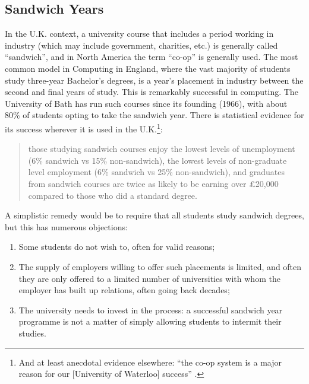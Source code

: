\documentclass[sigconf,anonymous]{acmart}
\begin{document}
\subsection{Sandwich Years}

In the U.K. context, a university course that includes a period
working in industry (which may include government, charities, etc.) is
generally called ``sandwich'', and in North America the term ``co-op''
is generally used. The most common model in Computing in England,
where the vast majority of students study three-year Bachelor's
degrees, is a year's placement in industry between the second and
final years of study. This is remarkably successful in computing. The
University of Bath has run such courses since its founding (1966),
with about 80\% of students opting to take the sandwich year. There is
statistical evidence for its success wherever it is used in the
U.K.\footnote{And at least anecdotal evidence elsewhere: ``the co-op
system is a major reason for our [University of Waterloo] success''
\cite{Watt2017a}.}:

\begin{quote} those studying sandwich courses enjoy the lowest levels
of unemployment (6\% sandwich vs 15\% non-sandwich), the lowest levels
of non-graduate level employment (6\% sandwich vs 25\% non-sandwich),
and graduates from sandwich courses are twice as likely to be earning
over \pounds20,000 compared to those who did a standard
degree. \cite[\P2.5]{Shadbolt2016a}
\end{quote}

A simplistic remedy would be to require that all students study
sandwich degrees, but this has numerous objections:

\begin{enumerate}
\item Some students do not wish to, often for valid reasons;
\item The supply of employers willing to offer such placements is
limited, and often they are only offered to a limited number of
universities with whom the employer has built up relations, often
going back decades;
\item The university needs to invest in the process: a successful
sandwich year programme is not a matter of simply allowing students to
intermit their studies.
\end{enumerate}
\end{document}
